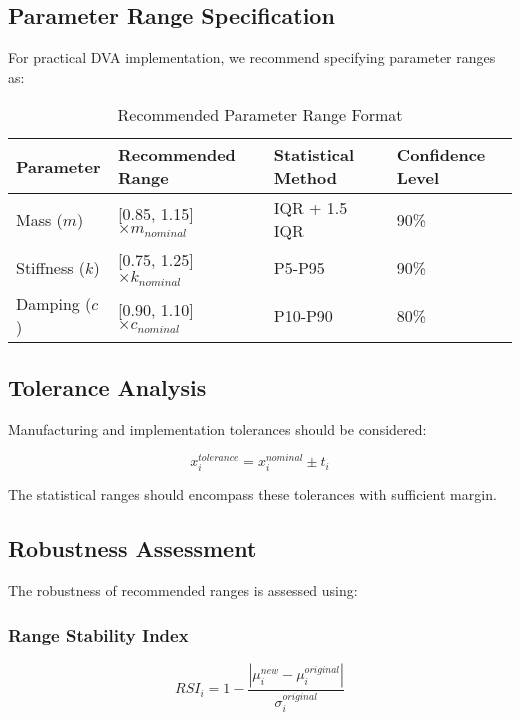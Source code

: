 \documentclass[../main.tex]{subfiles}
\begin{document}
\subsection{Parameter Range Specification}

For practical DVA implementation, we recommend specifying parameter ranges as:

\begin{table}[H]
\centering
\caption{Recommended Parameter Range Format}
\begin{tabular}{@{}llll@{}}
\toprule
Parameter & Recommended Range & Statistical Method & Confidence Level \\
\midrule
Mass ($m$) & [0.85, 1.15] $\times m_{nominal}$ & IQR + 1.5 IQR & 90\% \\
Stiffness ($k$) & [0.75, 1.25] $\times k_{nominal}$ & P5-P95 & 90\% \\
Damping ($c$) & [0.90, 1.10] $\times c_{nominal}$ & P10-P90 & 80\% \\
\bottomrule
\end{tabular}
\end{table}

\subsection{Tolerance Analysis}

Manufacturing and implementation tolerances should be considered:

\begin{equation}
x_i^{tolerance} = x_i^{nominal} \pm t_i
\label{eq:tolerance}
\end{equation}

The statistical ranges should encompass these tolerances with sufficient margin.

\subsection{Robustness Assessment}

The robustness of recommended ranges is assessed using:

\subsubsection{Range Stability Index}

\begin{equation}
RSI_i = 1 - \frac{|\mu_i^{new} - \mu_i^{original}|}{\sigma_i^{original}}
\label{eq:rsi}
\end{equation}
\end{document}
